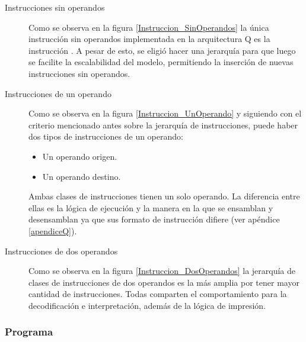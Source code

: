 \begin{description}
\item[Instrucciones sin operandos] Como se observa en la figura \ref{Instruccion_SinOperandos} la única instrucción sin operandos implementada en la arquitectura Q es la instrucción . A pesar de esto, se eligió hacer una jerarquía para que luego se facilite la escalabilidad del modelo, permitiendo la inserción de nuevas instrucciones sin operandos.


\item[Instrucciones de un operando] 
Como se observa en la figura \ref{Instruccion_UnOperando} y siguiendo con el criterio mencionado antes sobre la jerarquía de instrucciones, puede haber dos tipos de instrucciones de un operando:

\begin{itemize}
\item Un operando origen.
\item Un operando destino.
\end{itemize}

Ambas clases de instrucciones tienen un solo operando. La diferencia entre ellas es la lógica de ejecución y la manera en la que se ensamblan y desensamblan ya que sus formato de instrucción difiere (ver apéndice \ref{apendiceQ}).



\item[Instrucciones de dos operandos]

Como se observa en la figura \ref{Instruccion_DosOperandos} la jerarquía de clases de instrucciones de dos operandos es la más amplia por tener mayor cantidad de instrucciones. Todas comparten el comportamiento para la decodificación e interpretación, además de la lógica de impresión.


\end{description}




\subsubsection{Programa}


